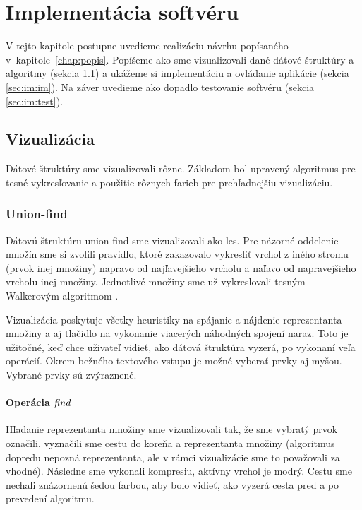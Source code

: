 \chapter{Implementácia softvéru}\label{chap:implementacia}

V tejto kapitole postupne uvedieme realizáciu návrhu popísaného 
v~kapitole~\ref{chap:popis}. Popíšeme ako sme vizualizovali dané 
dátové štruktúry a algoritmy (sekcia \ref{sec:im:vis}) a ukážeme si 
implementáciu a ovládanie aplikácie (sekcia \ref{sec:im:im}). 
Na záver uvedieme ako dopadlo testovanie softvéru (sekcia \ref{sec:im:test}).

\section{Vizualizácia}\label{sec:im:vis}

Dátové štruktúry sme vizualizovali rôzne. Základom bol upravený algoritmus pre 
tesné vykresľovanie a použitie rôznych farieb pre prehľadnejšiu vizualizáciu.

\subsection{Union-find}

Dátovú štruktúru union-find sme vizualizovali ako les. Pre názorné 
oddelenie množín sme si zvolili pravidlo, ktoré zakazovalo vykresliť vrchol 
z iného stromu (prvok inej množiny) 
napravo od najľavejšieho vrcholu a naľavo od napravejšieho vrcholu inej 
množiny. Jednotlivé množiny sme už vykreslovali tesným Walkerovým algoritmom 
\citep{walker}. 

Vizualizácia poskytuje všetky heuristiky na spájanie a 
nájdenie reprezentanta množiny a 
aj tlačidlo na vykonanie viacerých náhodných spojení naraz. Toto je užitočné, 
keď chce uživateľ vidieť, ako dátová štruktúra vyzerá, po vykonaní 
veľa operácií. Okrem bežného textového vstupu je možné vyberať prvky aj myšou. 
Vybrané prvky sú zvýraznené.

\subsubsection{Operácia $\mathop{\mathit{find}}$}

Hľadanie reprezentanta množiny sme vizualizovali tak, že sme vybratý prvok 
označili, vyznačili sme cestu do koreňa a reprezentanta množiny 
(algoritmus dopredu nepozná reprezentanta, ale v rámci vizualizácie sme to 
považovali za vhodné). Následne sme vykonali kompresiu, aktívny vrchol je 
modrý. Cestu sme nechali 
znázornenú šedou farbou, aby bolo vidieť, ako vyzerá cesta pred a po prevedení 
algoritmu. 

